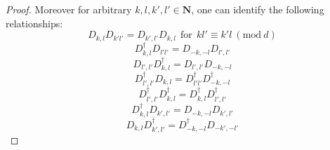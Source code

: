 \documentclass[12pt]{amsart}
\numberwithin{equation}{section}
\begin{document}
\begin{proof}
       
       
       
Moreover for arbitrary $k,l,k',l' \in \mathbf{N}$, one can identify the following relationships:
\begin{equation}\label{rel1}
    D_{k,l}D_{k'l'}=D_{k',l'}D_{k,l} ~~\text{for}~~ k l' \equiv k'l ~(\text{mod} ~d) 
\end{equation}
\begin{equation}\label{rel2}
    D_{k,l}^{\dagger}D_{l'l'}=D_{-k,-l}D_{l',l'}
\end{equation}
\begin{equation}\label{rel3}
    D_{l',l'}D_{k,l}^{\dagger}=D_{l',l'}D_{-k,-l}
\end{equation}
\begin{equation}\label{rel4}
    D_{l',l'}^{\dagger}D_{k,l}=D_{l'l'}^{\dagger}D_{-k,-l}^{\dagger}
\end{equation}
\begin{equation}\label{rel5}
    D_{l',l'}^{\dagger}D_{k,l}^{\dagger}=D_{k,l}^{\dagger}D_{l',l'}^{\dagger}
\end{equation}
\begin{equation}\label{rel6}
    D_{k,l}^{\dagger}D_{k',l'}=D_{-k,-l}D_{k',l'}
\end{equation}
\begin{equation}\label{rel7}
    D_{k,l}D_{k',l'}^{\dagger}=D_{-k,-l}^{\dagger}D_{-k',-l'}

\end{equation}
\end{proof}
\end{document}
